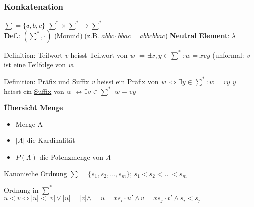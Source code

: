 \documentclass[a4paper,10pt]{article}
\begin{document}
\subsubsection{Konkatenation}
$\sum=\{a,b,c\}$ $\sum^*\times\sum^*\rightarrow\sum^*$ 
\\ \textbf{Def.}: $(\sum^*,\cdot)$ (Monuid) (z.B. $abbc\cdot bbac=abbcbbac$)
\textbf{Neutral Element}: $\lambda$
\begin{defbox}
    {Definition: Teilwort}
    \textit{v} heisst Teilwort von \textit{w} $\iff \exists x,y\in\sum^*:w=xvy$ (unformal: \textit{v} ist eine Teilfolge von \textit{w}.
\end{defbox}
\begin{defbox}
    {Definition: Präfix und Suffix}
    \textit{v} heisst ein \underline{Präfix} von \textit{w} $\iff \exists y \in \sum^*:w=vy$
    \textit{y} heisst ein \underline{Suffix} von \textit{w} $\iff \exists v \in \sum^*:w=vy$
\end{defbox}
\textbf{Übersicht Menge}
\begin{itemize}
    \item Menge A
    \item $|A|$ die Kardinalität
    \item $P(A)$ die Potenzmenge von \textit{A}
\end{itemize}
\begin{defbox}
    {Kanonische Ordnung}
    $\sum=\{s_1,s_2,...,s_m\}$; $s_1<s_2<...<s_m$
\end{defbox}
\begin{defbox}
    {Ordnung in $\sum^*$}
    $u<v\iff |u|<|v| \vee |u|=|v|\wedge =u=xs_i\cdot u'\wedge v=xs_j\cdot v'\wedge s_i<s_j$
\end{defbox}
\end{document}
